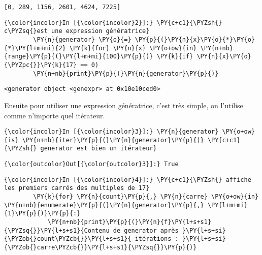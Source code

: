     \begin{Verbatim}[commandchars=\\\{\},frame=single,framerule=0.3mm,rulecolor=\color{cellframecolor}]
[0, 289, 1156, 2601, 4624, 7225]
\end{Verbatim}

    \begin{Verbatim}[commandchars=\\\{\},frame=single,framerule=0.3mm,rulecolor=\color{cellframecolor}]
{\color{incolor}In [{\color{incolor}2}]:} \PY{c+c1}{\PYZsh{} c\PYZsq{}est une expression génératrice}
        \PY{n}{generator} \PY{o}{=} \PY{p}{(}\PY{n}{x}\PY{o}{*}\PY{o}{*}\PY{l+m+mi}{2} \PY{k}{for} \PY{n}{x} \PY{o+ow}{in} \PY{n+nb}{range}\PY{p}{(}\PY{l+m+mi}{100}\PY{p}{)} \PY{k}{if} \PY{n}{x}\PY{o}{\PYZpc{}}\PY{k}{17} == 0) 
        \PY{n+nb}{print}\PY{p}{(}\PY{n}{generator}\PY{p}{)}
\end{Verbatim}


    \begin{Verbatim}[commandchars=\\\{\},frame=single,framerule=0.3mm,rulecolor=\color{cellframecolor}]
<generator object <genexpr> at 0x10e10ced0>
\end{Verbatim}

    Ensuite pour utiliser une expression génératrice, c'est très simple, on
l'utilise comme n'importe quel itérateur.

    \begin{Verbatim}[commandchars=\\\{\},frame=single,framerule=0.3mm,rulecolor=\color{cellframecolor}]
{\color{incolor}In [{\color{incolor}3}]:} \PY{n}{generator} \PY{o+ow}{is} \PY{n+nb}{iter}\PY{p}{(}\PY{n}{generator}\PY{p}{)} \PY{c+c1}{\PYZsh{} generator est bien un itérateur}
\end{Verbatim}


\begin{Verbatim}[commandchars=\\\{\},frame=single,framerule=0.3mm,rulecolor=\color{cellframecolor}]
{\color{outcolor}Out[{\color{outcolor}3}]:} True
\end{Verbatim}
            
    \begin{Verbatim}[commandchars=\\\{\},frame=single,framerule=0.3mm,rulecolor=\color{cellframecolor}]
{\color{incolor}In [{\color{incolor}4}]:} \PY{c+c1}{\PYZsh{} affiche les premiers carrés des multiples de 17}
        \PY{k}{for} \PY{n}{count}\PY{p}{,} \PY{n}{carre} \PY{o+ow}{in} \PY{n+nb}{enumerate}\PY{p}{(}\PY{n}{generator}\PY{p}{,} \PY{l+m+mi}{1}\PY{p}{)}\PY{p}{:}
            \PY{n+nb}{print}\PY{p}{(}\PY{n}{f}\PY{l+s+s1}{\PYZsq{}}\PY{l+s+s1}{Contenu de generator après }\PY{l+s+si}{\PYZob{}count\PYZcb{}}\PY{l+s+s1}{ itérations : }\PY{l+s+si}{\PYZob{}carre\PYZcb{}}\PY{l+s+s1}{\PYZsq{}}\PY{p}{)}
\end{Verbatim}



